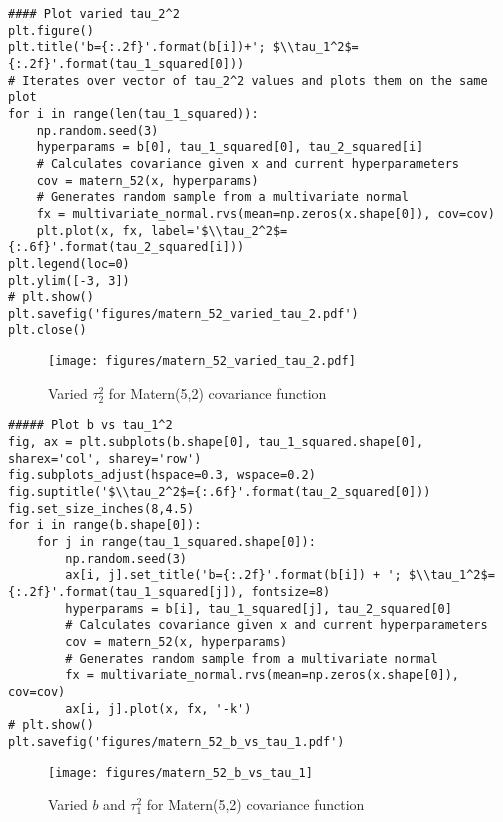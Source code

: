 \documentclass[10pt]{article}
\begin{document}
\begin{enumerate}[label=(\Alph*)]
        \begin{lstlisting}
#### Plot varied tau_2^2
plt.figure()
plt.title('b={:.2f}'.format(b[i])+'; $\\tau_1^2$={:.2f}'.format(tau_1_squared[0]))
# Iterates over vector of tau_2^2 values and plots them on the same plot
for i in range(len(tau_1_squared)):
    np.random.seed(3)
    hyperparams = b[0], tau_1_squared[0], tau_2_squared[i]
    # Calculates covariance given x and current hyperparameters
    cov = matern_52(x, hyperparams)
    # Generates random sample from a multivariate normal
    fx = multivariate_normal.rvs(mean=np.zeros(x.shape[0]), cov=cov)
    plt.plot(x, fx, label='$\\tau_2^2$={:.6f}'.format(tau_2_squared[i]))
plt.legend(loc=0)
plt.ylim([-3, 3])
# plt.show()
plt.savefig('figures/matern_52_varied_tau_2.pdf')
plt.close()
        \end{lstlisting}

        \begin{figure}[ht] 
          \centering 
          \texttt{[image: figures/matern\_52\_varied\_tau\_2.pdf]}
          \caption{\label{fig:matern_52_varied_tau_2} Varied $\tau_2^2$ for Matern(5,2) covariance function}
        \end{figure}

        \begin{lstlisting}
##### Plot b vs tau_1^2
fig, ax = plt.subplots(b.shape[0], tau_1_squared.shape[0], sharex='col', sharey='row')
fig.subplots_adjust(hspace=0.3, wspace=0.2)
fig.suptitle('$\\tau_2^2$={:.6f}'.format(tau_2_squared[0]))
fig.set_size_inches(8,4.5)
for i in range(b.shape[0]):
    for j in range(tau_1_squared.shape[0]):
        np.random.seed(3)
        ax[i, j].set_title('b={:.2f}'.format(b[i]) + '; $\\tau_1^2$={:.2f}'.format(tau_1_squared[j]), fontsize=8)
        hyperparams = b[i], tau_1_squared[j], tau_2_squared[0]
        # Calculates covariance given x and current hyperparameters
        cov = matern_52(x, hyperparams)
        # Generates random sample from a multivariate normal
        fx = multivariate_normal.rvs(mean=np.zeros(x.shape[0]), cov=cov)
        ax[i, j].plot(x, fx, '-k')
# plt.show()
plt.savefig('figures/matern_52_b_vs_tau_1.pdf')
        \end{lstlisting}


        \begin{figure}[ht] 
          \centering 
          \texttt{[image: figures/matern\_52\_b\_vs\_tau\_1]}
          \caption{\label{fig:matern_52_b_vs_tau_1} Varied $b$ and $\tau_1^2$ for Matern(5,2) covariance function}
        \end{figure}


\end{enumerate}
\end{document}
